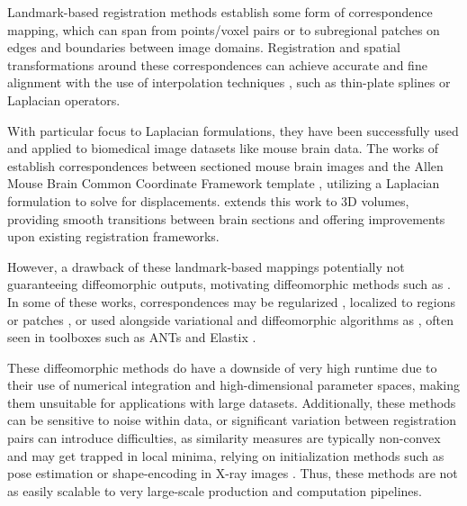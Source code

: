 Landmark-based registration methods \cite{MAINTZ19981, ZITOVA2003977} establish some form of correspondence mapping, which can span from points/voxel pairs or to subregional patches \cite{Ourselin2000BlockMA,PatchBasedRegistration} on edges and boundaries between image domains. Registration and spatial transformations around these correspondences can achieve accurate and fine alignment with the use of interpolation techniques \cite{ALLASIA20141}, such as thin-plate splines \cite{Sun2011} or Laplacian operators.

With particular focus to Laplacian formulations, they have been successfully used and applied to biomedical image datasets like mouse brain data. The works of \cite{AgarwalRobustRegistration, AgarwalXG16, AGARWAL201845} establish correspondences between sectioned mouse brain images and the Allen Mouse Brain Common Coordinate Framework template \cite{WANG2020936}, utilizing a Laplacian formulation to solve for displacements. \cite{RegBoost2025} extends this work to 3D volumes, providing smooth transitions between brain sections and offering improvements upon existing registration frameworks.

However, a drawback of these landmark-based mappings potentially not guaranteeing diffeomorphic outputs, motivating diffeomorphic methods such as \cite{Beg2005,THIRION1998243,VERCAUTEREN2009S61,sphericaldemons}. In some of these works, correspondences may be regularized \cite{Shusharina2012-ez}, localized to regions \cite{Ourselin2000BlockMA} or patches \cite{PatchBasedRegistration}, or used alongside variational and diffeomorphic algorithms as \cite{ASHBURNER200795, AVANTS200826, VERCAUTEREN2009S61}, often seen in toolboxes such as ANTs \cite{AVANTS200826} and Elastix \cite{Klein2010elastixAT}. 

These diffeomorphic methods do have a downside of very high runtime due to their use of numerical integration and high-dimensional parameter spaces, making them unsuitable for applications with large datasets. Additionally, these methods can be sensitive to noise within data, or significant variation between registration pairs can introduce difficulties, as similarity measures are typically non-convex and may get trapped in local minima, relying on initialization methods such as pose estimation \cite{VARNAVAS2015108} or shape-encoding in X-ray images \cite{Miao2013}. Thus, these methods are not as easily scalable to very large-scale production and computation pipelines.


